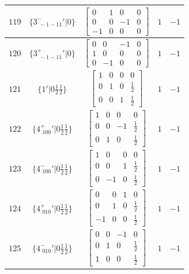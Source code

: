 \documentclass[fleqn,8pt]{jsarticle}
\begin{document}
\begin{longtable}{ccccc}
$ 119 $ & $ \{3^{-}_{\,\,-1-11}{}'|0\} $ & $ \begin{bmatrix} 0 & 1 & 0 & 0 \\ 0 & 0 & -1 & 0 \\ -1 & 0 & 0 & 0 \end{bmatrix} $ & $ 1 $ & $ -1 $ \\ \hline
$ 120 $ & $ \{3^{+}_{\,\,-1-11}{}'|0\} $ & $ \begin{bmatrix} 0 & 0 & -1 & 0 \\ 1 & 0 & 0 & 0 \\ 0 & -1 & 0 & 0 \end{bmatrix} $ & $ 1 $ & $ -1 $ \\ \hline
$ 121 $ & $ \{1{}'|0 \frac{1}{2} \frac{1}{2}\} $ & $ \begin{bmatrix} 1 & 0 & 0 & 0 \\ 0 & 1 & 0 & \frac{1}{2} \\ 0 & 0 & 1 & \frac{1}{2} \end{bmatrix} $ & $ 1 $ & $ -1 $ \\ \hline
$ 122 $ & $ \{4^{+}_{\,\,100}{}'|0 \frac{1}{2} \frac{1}{2}\} $ & $ \begin{bmatrix} 1 & 0 & 0 & 0 \\ 0 & 0 & -1 & \frac{1}{2} \\ 0 & 1 & 0 & \frac{1}{2} \end{bmatrix} $ & $ 1 $ & $ -1 $ \\ \hline
$ 123 $ & $ \{4^{-}_{\,\,100}{}'|0 \frac{1}{2} \frac{1}{2}\} $ & $ \begin{bmatrix} 1 & 0 & 0 & 0 \\ 0 & 0 & 1 & \frac{1}{2} \\ 0 & -1 & 0 & \frac{1}{2} \end{bmatrix} $ & $ 1 $ & $ -1 $ \\ \hline
$ 124 $ & $ \{4^{+}_{\,\,010}{}'|0 \frac{1}{2} \frac{1}{2}\} $ & $ \begin{bmatrix} 0 & 0 & 1 & 0 \\ 0 & 1 & 0 & \frac{1}{2} \\ -1 & 0 & 0 & \frac{1}{2} \end{bmatrix} $ & $ 1 $ & $ -1 $ \\ \hline
$ 125 $ & $ \{4^{-}_{\,\,010}{}'|0 \frac{1}{2} \frac{1}{2}\} $ & $ \begin{bmatrix} 0 & 0 & -1 & 0 \\ 0 & 1 & 0 & \frac{1}{2} \\ 1 & 0 & 0 & \frac{1}{2} \end{bmatrix} $ & $ 1 $ & $ -1 $ \\ \hline

\end{longtable}
\end{document}
